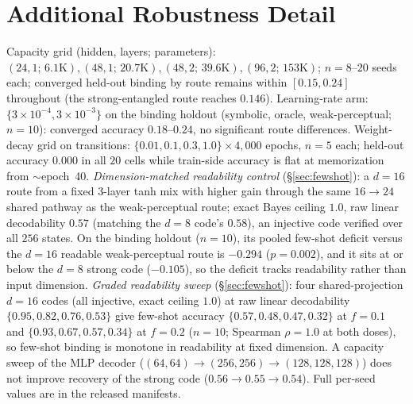 \documentclass[10pt]{article} %
\begin{document}
\section{Additional Robustness Detail}
\label{app:robust}
Capacity grid (hidden, layers; parameters): $(24,1;\,6.1\text{K}), (48,1;\,20.7\text{K}),
(48,2;\,39.6\text{K}), (96,2;\,153\text{K})$; $n{=}8$--$20$ seeds each;
converged held-out binding by route remains within $[0.15, 0.24]$ throughout (the strong-entangled
route reaches $0.146$). Learning-rate arm:
$\{3\times10^{-4}, 3\times10^{-3}\}$ on the binding holdout (symbolic, oracle, weak-perceptual;
$n{=}10$): converged accuracy $0.18$--$0.24$, no significant route differences. Weight-decay grid on
transitions: $\{0.01, 0.1, 0.3, 1.0\} \times 4{,}000$ epochs, $n{=}5$ each; held-out accuracy
$0.000$ in all $20$ cells while train-side accuracy is flat at memorization from
$\sim$epoch~40. \emph{Dimension-matched readability control} (\S\ref{sec:fewshot}): a $d{=}16$
route from a fixed 3-layer tanh mix with higher gain through the same $16{\to}24$ shared pathway as
the weak-perceptual route; exact Bayes ceiling $1.0$, raw linear decodability $0.57$ (matching the
$d{=}8$ code's $0.58$), an injective code verified over all $256$ states. On the binding holdout
($n{=}10$), its pooled few-shot deficit versus the $d{=}16$ readable weak-perceptual route is
$-0.294$ ($p=0.002$), and it sits at or below the $d{=}8$ strong code ($-0.105$), so the deficit
tracks readability rather than input dimension. \emph{Graded readability sweep} (\S\ref{sec:fewshot}):
four shared-projection $d{=}16$ codes (all injective, exact ceiling $1.0$) at raw linear decodability
$\{0.95, 0.82, 0.76, 0.53\}$ give few-shot accuracy $\{0.57, 0.48, 0.47, 0.32\}$ at $f{=}0.1$ and
$\{0.93, 0.67, 0.57, 0.34\}$ at $f{=}0.2$ ($n{=}10$; Spearman $\rho{=}1.0$ at both doses), so few-shot
binding is monotone in readability at fixed dimension. A capacity sweep of the MLP decoder
($(64,64)\to(256,256)\to(128,128,128)$) does not improve recovery of the strong code
($0.56\to0.55\to0.54$). Full per-seed values are in the released manifests.
\end{document}
